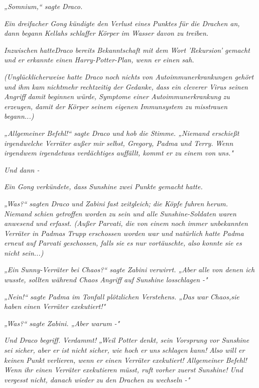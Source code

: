 {\emph{„\emph{Somnium,}“ sagte Draco.}

\emph{Ein dreifacher Gong kündigte den Verlust eines Punktes für die Drachen an, dann begann Kellahs schlaffer Körper im Wasser davon zu treiben.}

\emph{Inzwischen} \emph{\emph{hatte}Draco bereits Bekanntschaft mit dem Wort 'Rekursion' gemacht und er erkannte einen Harry-Potter-Plan, wenn er einen sah.}

\emph{(Unglücklicherweise hatte Draco noch} \emph{\emph{nichts}} \emph{von Autoimmunerkrankungen gehört und ihm kam} \emph{\emph{nicht}mehr} \emph{rechtzeitig der Gedanke, dass ein cleverer Virus seinen Angriff} \emph{damit} \emph{beginnen würde, Symptome einer Autoimmunerkrankung} \emph{zu} \emph{erzeugen, damit der Körper seinem eigenen Immunsystem zu misstrauen begann...)}

\emph{„\emph{Allgemeiner Befehl!}“ sagte Draco und hob die Stimme. „Niemand erschießt irgendwelche Verräter außer mir selbst, Gregory, Padma und Terry.} \emph{Wenn irgendwem irgendetwas verdächtiges auffällt, kommt er zu einem von} \emph{\emph{uns.}"}

\emph{Und dann -}

\emph{Ein Gong verkündete, dass Sunshine zwei Punkte} \emph{gemacht} \emph{hatte.}

\emph{„\emph{Was?}“ sagten Draco und Zabini} \emph{fast zeitgleich; die Köpfe fuhren herum. Niemand schien getroffen worden zu sein und alle Sunshine-Soldaten} \emph{waren anwesend und} \emph{erfasst. (Außer Parvati, die von einem noch immer unbekannten Verräter in Padmas Trupp erschossen worden war und natürlich hatte Padma erneut auf Parvati geschossen, falls sie es nur vortäuschte, also} \emph{konnte sie es nicht sein...)}

\emph{„Ein Sunny-Verräter bei Chaos?“ sagte Zabini verwirrt. „Aber alle von denen ich wusste, sollten während Chaos Angriff auf Sunshine losschlagen -"}

\emph{„Nein!“ sagte Padma im Tonfall plötzlichen Verstehens. „Das war} \emph{\emph{Chaos,}sie} \emph{haben} \emph{einen Verräter exekutiert!"}

\emph{„\emph{Was?}“ sagte Zabini. „Aber warum -"}

\emph{Und Draco begriff.} \emph{\emph{Verdammt!}} \emph{„Weil Potter denkt, sein Vorsprung vor Sunshine sei sicher, aber er ist nicht sicher, wie hoch er} \emph{\emph{uns}} \emph{schlagen kann!} \emph{Also will er keinen Punkt verlieren, wenn er einen Verräter exekutiert!} \emph{\emph{Allgemeiner Befehl!}} \emph{Wenn ihr einen Verräter exekutieren müsst, ruft vorher zuerst Sunshine! Und vergesst nicht, danach wieder zu den Drachen zu wechseln -"}

}
